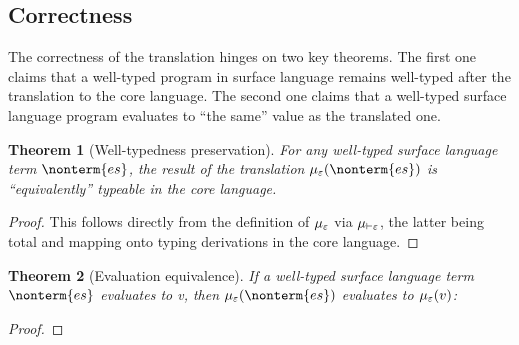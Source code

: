\documentclass[a4paper]{article}
\newtheorem{theorem}{Theorem}
\begin{document}
\subsection{Correctness}

The correctness of the translation hinges on two key theorems.
The first one claims that a well-typed program in surface language remains well-typed after the translation to the core language.
The second one claims that a well-typed surface language program evaluates to ``the same'' value as the translated one.

\begin{theorem}[Well-typedness preservation]
  For any well-typed surface language term $\nonterm{es}$,
  the result of the translation $\tranterm(\nonterm{es})$ is ``equivalently'' typeable in the core language.
\end{theorem}
\begin{proof}
  This follows directly from the definition of $\mu_\varepsilon$ via $\mu_{\vdash\varepsilon}$,
  the latter being total and mapping onto typing derivations in the core language.
\end{proof}

\begin{theorem}[Evaluation equivalence]
  If a well-typed surface language term $\nonterm{es}$ evaluates to v, then $\tranterm(\nonterm{es})$ evaluates to $\mu_\varepsilon(v)$:
\end{theorem}
\begin{proof}
\end{proof}



\end{document}
